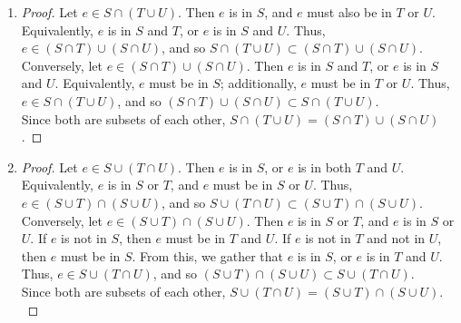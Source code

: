 \documentclass{homework}
\begin{document}
\begin{solution}
\begin{enumerate}[label=(\alph*)]
  \item
    \begin{proof}[Proof]
      Let $e\in S\cap \left( T\cup U \right) $. Then $e$ is in $S$, and $e$ must also be in $T$ or
      $U$. Equivalently, $e$ is in $S$ and $T$, or $e$ is in $S$ and $U$. Thus, $e\in \left( S\cap T
      \right) \cup \left( S\cap U \right)$, and so $S\cap \left( T\cup U \right) \subset \left(
    S\cap T \right) \cup \left( S\cap U \right) $.\\
      Conversely, let $e\in \left( S\cap T \right) \cup \left( S\cap U \right)$. Then $e$ is in
      $S$ and $T$, or $e$ is in $S$ and $U$. Equivalently, $e$ must be in $S$; additionally, $e$ 
      must be in $T$ or $U$. Thus, $e\in S\cap \left( T\cup U \right)$, and so $\left( S\cap T
      \right) \cup \left( S\cap U \right) \subset S\cap \left( T\cup U \right) $. \\
      Since both are subsets of each other, $S\cap \left( T\cup U \right) = \left( S\cap T
      \right)\cup \left( S\cap U \right) $.
    \end{proof}
    
  \item
    \begin{proof}[Proof]
      Let $e\in S\cup \left( T\cap U \right)$. Then $e$ is in $S$, or $e$ is in both $T$ and $U$.
      Equivalently, $e$ is in $S$ or $T$, and $e$ must be in $S$ or $U$. Thus, $e\in \left( S\cup T
      \right) \cap \left( S\cup U \right)$, and so $S\cup \left( T\cap U \right) \subset \left(
    S\cup T \right) \cap \left( S\cup U \right) $. \\
      Conversely, let $e\in \left( S\cup T \right) \cap \left( S\cup U \right)$. Then $e$ is in
      $S$ or $T$, and $e$ is in $S$ or $U$. If $e$ is not in $S$, then $e$ must be in $T$ and
      $U$. If $e$ is not in $T$ and not in $U$, then $e$ must be in $S$. From this, we gather that
      $e$ is in $S$, or $e$ is in $T$ and $U$. Thus, $e\in S\cup \left( T\cap U \right)$, and so
      $\left( S\cup T \right) \cap \left( S\cup U \right) \subset S\cup \left( T\cap U \right)
      $.\\
      Since both are subsets of each other, $S\cup \left( T\cap U \right) = \left( S\cup T \right)
      \cap \left( S\cup U \right).$
    \end{proof}


\end{enumerate}
\end{solution}
\end{document}
